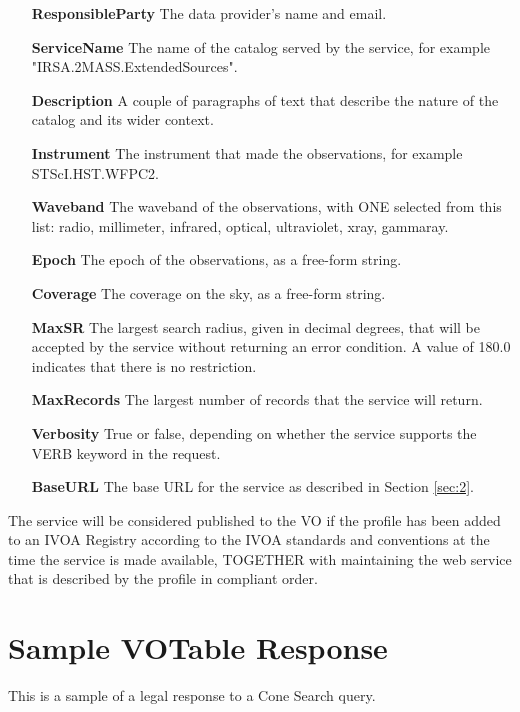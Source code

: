 \documentclass[11pt,a4paper]{ivoa}
\begin{document}
\begin{itemize}
	\item[\textbf{ResponsibleParty}] The data provider's name and email.
	\item[\textbf{ServiceName}] The name of the
		catalog served by the service, for example "IRSA.2MASS.ExtendedSources".
	\item[\textbf{Description}] A couple of paragraphs of text that describe
		the nature of the catalog and its wider context.
	\item[\textbf{Instrument}] The instrument that made the observations,
		for example STScI.\-HST.\-WFPC2.
	\item[\textbf{Waveband}] The waveband
		of the observations, with ONE selected from this list: radio,
		millimeter, infrared, optical, ultraviolet, xray, gammaray.
	\item[\textbf{Epoch}] The epoch of the observations, as a free-form string.
	\item[\textbf{Coverage}] The coverage on the sky, as a free-form string.
	\item[\textbf{MaxSR}] The largest search radius, given in decimal
		degrees, that will be accepted by the service without returning an error
		condition. A value of 180.0 indicates that there is no restriction.
	\item[\textbf{MaxRecords}] The largest number of records that the
		service will return.
	\item[\textbf{Verbosity}] True or false, depending
		on whether the service supports the VERB keyword in the request.
	\item[\textbf{BaseURL}] The base URL for the service as described in
		Section \ref{sec:2}.
\end{itemize}

The service will be considered
published to the VO if the profile has been added to an IVOA Registry
according to the IVOA standards and conventions at the time the service
is made available, TOGETHER with maintaining the web service that is
described by the profile in compliant order.

\appendix

\section{Sample VOTable Response}
\label{appendix:a}

This is a sample of a legal response to a Cone Search query.
\end{document}
